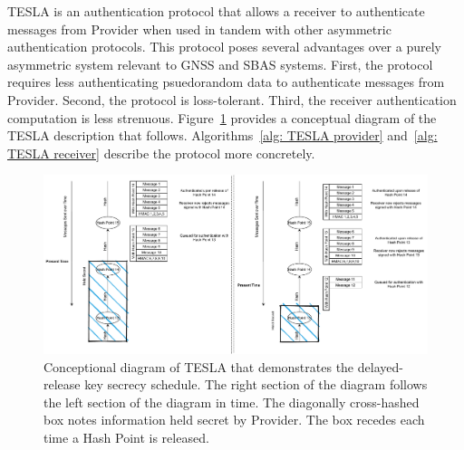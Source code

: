 \documentclass[APA,STIX1COL]{IONjournal/ION-APA Template}
\begin{document}
		TESLA is an authentication protocol that allows a receiver to authenticate messages from Provider when used in tandem with other asymmetric authentication protocols.
		This protocol poses several advantages over a purely asymmetric system relevant to GNSS and SBAS systems.
		First, the protocol requires less authenticating psuedorandom data to authenticate messages from Provider.
		Second, the protocol is loss-tolerant.
		Third, the receiver authentication computation is less strenuous.
		Figure~\ref{fig: TESLA Diagram} provides a conceptual diagram of the TESLA description that follows.
		Algorithms~\ref{alg: TESLA provider} and~\ref{alg: TESLA receiver} describe the protocol more concretely.
		\begin{figure}%
			\centering
			\includegraphics[width=\linewidth]{fig/TESLADiagram.pdf}
			\caption{
				Conceptional diagram of TESLA that demonstrates the delayed-release key secrecy schedule.
				The right section of the diagram follows the left section of the diagram in time.
				The diagonally cross-hashed box notes information held secret by Provider.
				The box recedes each time a Hash Point is released.
			}
			\label{fig: TESLA Diagram}
		\end{figure}
\end{document}
